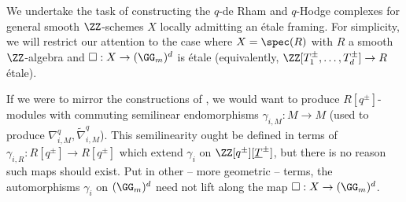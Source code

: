 We undertake the task of constructing the $q$-de Rham and $q$-Hodge complexes for general smooth $\ZZ$-schemes $X$ locally admitting an \'{e}tale framing. For simplicity, we will restrict our attention to the case where $X=\spec(R)$ with $R$ a smooth $\ZZ$-algebra and $\square:X\to(\GG_{m})^{d}$ is \'{e}tale (equivalently, $\ZZ[T_{1}^{\pm},\dots,T_{d}^{\pm}]\to R$ \'{e}tale). 

If we were to mirror the constructions of , we would want to produce $R[q^{\pm}]$-modules with commuting semilinear endomorphisms $\gamma_{i,M}:M\to M$ (used to produce $\nabla^{q}_{i,M},\widetilde{\nabla}_{i,M}^{q}$). This semilinearity ought be defined in terms of $\gamma_{i,R}:R[q^{\pm}]\to R[q^{\pm}]$ which extend $\gamma_{i}$ on $\ZZ[q^{\pm}][\underline{T}^{\pm}]$, but there is no reason such maps should exist. Put in other -- more geometric -- terms, the automorphisms $\gamma_{i}$ on $(\GG_{m})^{d}$ need not lift along the map $\square:X\to(\GG_{m})^{d}$.

